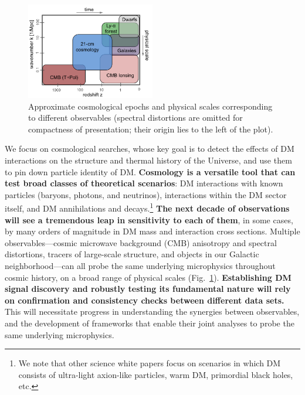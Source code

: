 \documentclass[12pt]{article}
\begin{document}
\begin{figure}
\begin{center}
\vspace{-0.9cm}
\includegraphics[width=0.5\textwidth]{scales.png}
\end{center}
\vspace{-0.8cm}
\caption{Approximate cosmological epochs and physical scales corresponding to different observables (spectral distortions are omitted for compactness of presentation; their origin lies to the left of the plot).}
\vspace{-0.2cm}
\label{fig:scales}
\end{figure}
We focus on cosmological searches, whose key goal is to detect the effects of DM interactions on the structure and thermal history of the Universe, and use them to pin down particle identity of DM.
\textbf{Cosmology is a versatile tool that can test broad classes of theoretical scenarios}: DM interactions with known particles (baryons, photons, and neutrinos), interactions within the DM sector itself, and DM annihilations and decays.\footnote{We note that other science white papers focus on scenarios in which DM consists of ultra-light axion-like particles, warm DM, primordial black holes, etc.}
\textbf{The next decade of observations will see a tremendous leap in sensitivity to each of them}, in some cases, by many orders of magnitude in DM mass and interaction cross sections.
Multiple observables---cosmic microwave background (CMB) anisotropy and spectral distortions, tracers of large-scale structure, and objects in our Galactic neighborhood---can all probe the same underlying microphysics throughout cosmic history, on a broad range of physical scales (Fig.~\ref{fig:scales}).
\textbf{Establishing DM signal discovery and robustly testing its fundamental nature will rely on confirmation and consistency checks between different data sets.}
This will necessitate progress in understanding the synergies between observables, and the development of frameworks that enable their joint analyses to probe the same underlying microphysics.
\end{document}
